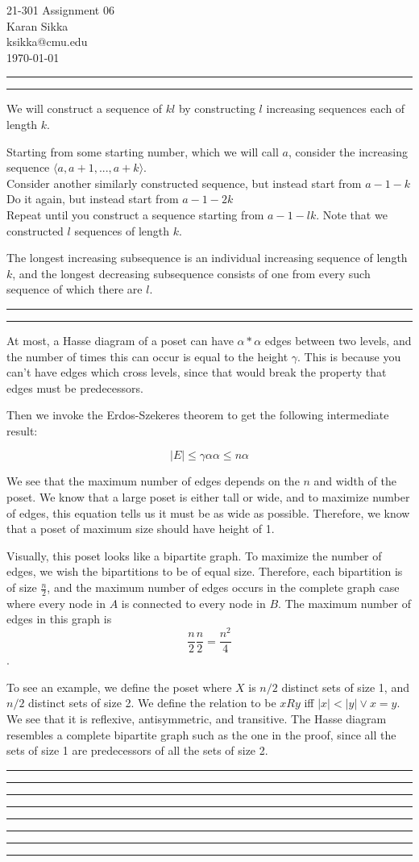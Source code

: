 \documentclass[11pt,letterpaper]{article}
\makeatletter
\newcommand{\question}[1] {\vspace{.25in} \hrule\vspace{0.5em}
\noindent{\bf #1} \vspace{0.5em}
\hrule \vspace{.10in}}
\newcommand{\myname}{Karan Sikka}
\newcommand{\myandrew}{ksikka@cmu.edu}
\newcommand{\myhwnum}{06}
\makeatother
\begin{document}
\medskip

\thispagestyle{plain}
\begin{center}                  %
{\Large 21-301 Assignment \myhwnum} \\
\myname \\
\myandrew \\
\today
\end{center}

\question{1}
We will construct a sequence of $kl$ by constructing $l$ increasing sequences each of length $k$.

Starting from some starting number, which we will call $a$, consider the increasing sequence $\langle a, a+1, ... , a + k \rangle$.\\
Consider another similarly constructed sequence, but instead start from $a - 1 - k $\\
Do it again, but instead start from $a - 1 - 2k $\\
Repeat until you construct a sequence starting from $a - 1 - lk $. Note that we constructed $l$ sequences of length $k$.

The longest increasing subsequence is an individual increasing sequence of length $k$,
and the longest decreasing subsequence consists of one from every such sequence of which there are $l$.


\question{2}
At most, a Hasse diagram of a poset can have $\alpha * \alpha$ edges between two levels,
and the number of times this can occur is equal to the height $\gamma$. This is because
you can't have edges which cross levels, since that would break the property that edges must be predecessors.

Then we invoke the Erdos-Szekeres theorem to get the following intermediate result:

$$ |E| \leq \gamma \alpha \alpha \leq n \alpha$$

We see that the maximum number of edges depends on the $n$ and width of the poset.
We know that a large poset is either tall or wide, and to maximize number of edges, this equation tells us it must be as wide as possible.
Therefore, we know that a poset of maximum size should have height of 1.

Visually, this poset looks like a bipartite graph. To maximize the number of edges, we wish the bipartitions to be of equal size.
Therefore, each bipartition is of size $\frac{n}{2}$, and the maximum number of edges occurs in the complete graph case where every node
in $A$ is connected to every node in $B$. The maximum number of edges in this graph is $$\frac{n}{2} \frac{n}{2} = \frac{n^2}{4}$$.

To see an example, we define the poset where $X$ is $n/2$ distinct sets of size 1, and $n/2$ distinct sets of size 2.
We define the relation to be $xRy$ iff $|x| < |y| \vee x = y$. We see that it is reflexive, antisymmetric, and transitive.
The Hasse diagram resembles a complete bipartite graph such as the one in the proof,
since all the sets of size 1 are predecessors of all the sets of size 2.

\question{3}

\question{4}

\question{5}

\question{6}
\end{document}
